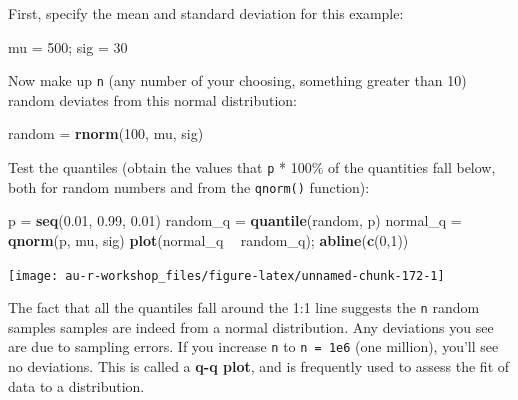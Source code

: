 \documentclass[]{book}
\newenvironment{Shaded}{\begin{snugshade}}{\end{snugshade}}
\newcommand{\KeywordTok}[1]{\textcolor[rgb]{0.13,0.29,0.53}{\textbf{#1}}}
\newcommand{\DecValTok}[1]{\textcolor[rgb]{0.00,0.00,0.81}{#1}}
\newcommand{\FloatTok}[1]{\textcolor[rgb]{0.00,0.00,0.81}{#1}}
\newcommand{\StringTok}[1]{\textcolor[rgb]{0.31,0.60,0.02}{#1}}
\newcommand{\OperatorTok}[1]{\textcolor[rgb]{0.81,0.36,0.00}{\textbf{#1}}}
\newcommand{\NormalTok}[1]{#1}
\theoremstyle{definition}
\theoremstyle{definition}
\theoremstyle{definition}
\theoremstyle{remark}
\begin{document}
First, specify the mean and standard deviation for this example:

\begin{Shaded}
\begin{Highlighting}[]
\NormalTok{mu =}\StringTok{ }\DecValTok{500}\NormalTok{; sig =}\StringTok{ }\DecValTok{30}
\end{Highlighting}
\end{Shaded}

Now make up \texttt{n} (any number of your choosing, something greater
than 10) random deviates from this normal distribution:

\begin{Shaded}
\begin{Highlighting}[]
\NormalTok{random =}\StringTok{ }\KeywordTok{rnorm}\NormalTok{(}\DecValTok{100}\NormalTok{, mu, sig)}
\end{Highlighting}
\end{Shaded}

Test the quantiles (obtain the values that \texttt{p} * 100\% of the
quantities fall below, both for random numbers and from the
\texttt{qnorm()} function):

\begin{Shaded}
\begin{Highlighting}[]
\NormalTok{p =}\StringTok{ }\KeywordTok{seq}\NormalTok{(}\FloatTok{0.01}\NormalTok{, }\FloatTok{0.99}\NormalTok{, }\FloatTok{0.01}\NormalTok{)}
\NormalTok{random_q =}\StringTok{ }\KeywordTok{quantile}\NormalTok{(random, p)}
\NormalTok{normal_q =}\StringTok{ }\KeywordTok{qnorm}\NormalTok{(p, mu, sig)}
\KeywordTok{plot}\NormalTok{(normal_q }\OperatorTok{~}\StringTok{ }\NormalTok{random_q); }\KeywordTok{abline}\NormalTok{(}\KeywordTok{c}\NormalTok{(}\DecValTok{0}\NormalTok{,}\DecValTok{1}\NormalTok{))}
\end{Highlighting}
\end{Shaded}

\begin{center}\texttt{[image: au-r-workshop\_files/figure-latex/unnamed-chunk-172-1]} \end{center}

The fact that all the quantiles fall around the 1:1 line suggests the
\texttt{n} random samples samples are indeed from a normal distribution.
Any deviations you see are due to sampling errors. If you increase
\texttt{n} to \texttt{n\ =\ 1e6} (one million), you'll see no
deviations. This is called a \textbf{q-q plot}, and is frequently used
to assess the fit of data to a distribution.
\end{document}
